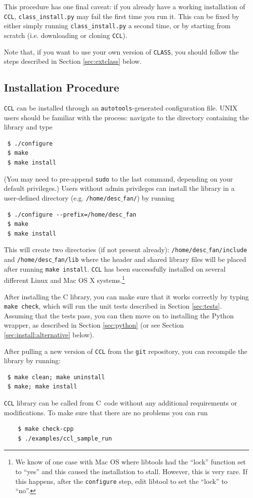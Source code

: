 \documentclass[\docopts]{\docclass}
\newcommand{\ccl}{{\tt CCL}\xspace}
\newcommand{\CC}{C\nolinebreak\hspace{-.05em}\raisebox{.3ex}{\footnotesize +}\nolinebreak\hspace{-.10em}\raisebox{.3ex}{\footnotesize +}}
\begin{document}
  This procedure has one final caveat: if you already have a working installation of {\tt CCL}, {\tt class\_install.py} may fail the first time you run it. This can be fixed by either simply running {\tt class\_install.py} a second time, or by starting from scratch (i.e. downloading or cloning {\tt CCL}).

  Note that, if you want to use your own version of {\tt CLASS}, you should follow the steps described in Section \ref{sec:extclass} below.

\subsection{Installation Procedure}

\ccl can be installed through an {\tt autotools}-generated configuration file. UNIX users should be familiar with the process: navigate to the directory containing the library and type
\begin{verbatim}
 $ ./configure
 $ make
 $ make install
\end{verbatim}
(You may need to pre-append {\tt sudo} to the last command, depending on your default privileges.) Users without admin privileges can install the library in a user-defined directory (e.g. {\tt /home/desc$\_$fan/}) by running
\begin{verbatim}
 $ ./configure --prefix=/home/desc_fan
 $ make
 $ make install
\end{verbatim}
This will create two directories (if not present already): {\tt /home/desc$\_$fan/include} and {\tt /home/desc$\_$fan/lib} where the header and shared library files will be placed after running {\tt make install}. \ccl has been successfully installed on several different Linux and Mac OS X systems.\footnote{We know of one case with Mac OS where libtools had the ``lock'' function set to ``yes'' and this caused the installation to stall. However, this is very rare. If this happens, after the {\tt configure} step, edit libtool to set the ``lock'' to ``no''.}

After installing the C library, you can make sure that it works correctly by typing {\tt make check}, which will run the unit tests described in Section \ref{sec:tests}. Assuming that the tests pass, you can then move on to installing the Python wrapper, as described in Section \ref{sec:python} (or see Section \ref{sec:install:alternative} below).

After pulling a new version of \ccl from the {\tt git} repository, you can recompile the library by running:
\begin{verbatim}
 $ make clean; make uninstall
 $ make; make install
\end{verbatim}
\ccl library can be called from \CC\ code without any  additional requirements or modifications. To make sure that there are no problems you can run
\begin{verbatim}
    $ make check-cpp
    $ ./examples/ccl_sample_run
   \end{verbatim}
\end{document}

